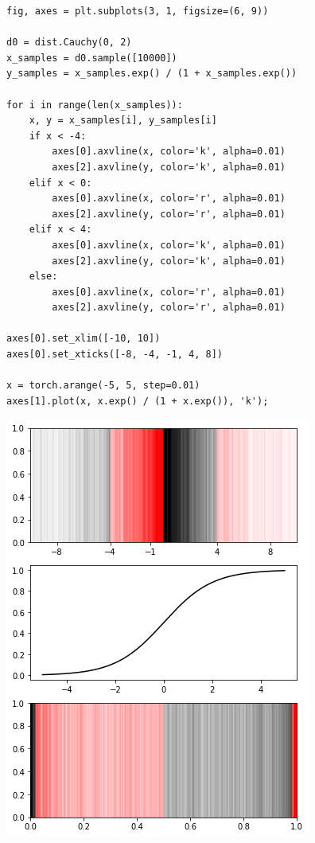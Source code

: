 \documentclass[11pt]{article}
\begin{document}
\begin{verbatim}
fig, axes = plt.subplots(3, 1, figsize=(6, 9))

d0 = dist.Cauchy(0, 2)
x_samples = d0.sample([10000])
y_samples = x_samples.exp() / (1 + x_samples.exp())

for i in range(len(x_samples)):
    x, y = x_samples[i], y_samples[i]
    if x < -4:
        axes[0].axvline(x, color='k', alpha=0.01)
        axes[2].axvline(y, color='k', alpha=0.01)
    elif x < 0:
        axes[0].axvline(x, color='r', alpha=0.01)
        axes[2].axvline(y, color='r', alpha=0.01)
    elif x < 4:
        axes[0].axvline(x, color='k', alpha=0.01)
        axes[2].axvline(y, color='k', alpha=0.01)
    else:
        axes[0].axvline(x, color='r', alpha=0.01)
        axes[2].axvline(y, color='r', alpha=0.01)

axes[0].set_xlim([-10, 10])
axes[0].set_xticks([-8, -4, -1, 4, 8])

x = torch.arange(-5, 5, step=0.01)
axes[1].plot(x, x.exp() / (1 + x.exp()), 'k');
\end{verbatim}

\begin{center}
\includegraphics[width=.9\linewidth]{./.ob-jupyter/6f6a16e25fd8b27743bbdc2071af4e35e228b2ba.png}
\end{center}
\end{document}
